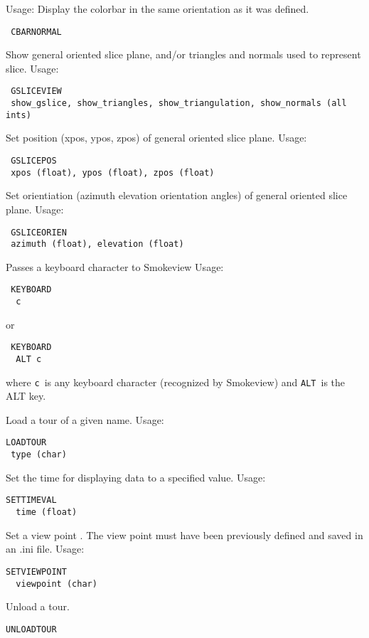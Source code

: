 \documentclass[11pt,twoside]{book}
\newcommand{\hitem}[1]{\item[{\bf #1} \hfill]}
\begin{document}
\hitem{CBARNORMAL}
Usage: Display the colorbar in the same orientation as it was defined.
\begin{lstlisting}
 CBARNORMAL
\end{lstlisting}

\hitem{GSLICEVIEW}Show general oriented slice plane, and/or triangles and normals used to represent slice.
Usage:
\begin{lstlisting}
 GSLICEVIEW
 show_gslice, show_triangles, show_triangulation, show_normals (all ints)
\end{lstlisting}

\hitem{GSLICEPOS}Set position (xpos, ypos, zpos) of general oriented slice plane.
Usage:
\begin{lstlisting}
 GSLICEPOS
 xpos (float), ypos (float), zpos (float)
\end{lstlisting}


\hitem{GSLICEORIEN}Set orientiation (azimuth elevation orientation angles) of general oriented slice plane.
Usage:
\begin{lstlisting}
 GSLICEORIEN
 azimuth (float), elevation (float)
\end{lstlisting}

\hitem{KEYBOARD}Passes a keyboard character to Smokeview
Usage:
\begin{lstlisting}
 KEYBOARD
  c
\end{lstlisting}
or
\begin{lstlisting}
 KEYBOARD
  ALT c
\end{lstlisting}
where {\tt c}\ is any keyboard character (recognized by Smokeview) and {\tt ALT}\ is the ALT key.

\hitem{LOADTOUR}Load a tour of a given name.
Usage:
\begin{lstlisting}
LOADTOUR
 type (char)
\end{lstlisting}

\hitem{SETTIMEVAL}Set the time for displaying data to a specified value.
Usage:
\begin{lstlisting}
SETTIMEVAL
  time (float)
\end{lstlisting}

\hitem{SETVIEWPOINT}Set a view point .  The view point must have been previously defined and
saved in an .ini file.
Usage:
\begin{lstlisting}
SETVIEWPOINT
  viewpoint (char)
\end{lstlisting}

\hitem{UNLOADTOUR}Unload a tour.
\begin{lstlisting}
UNLOADTOUR
\end{lstlisting}
\end{document}
